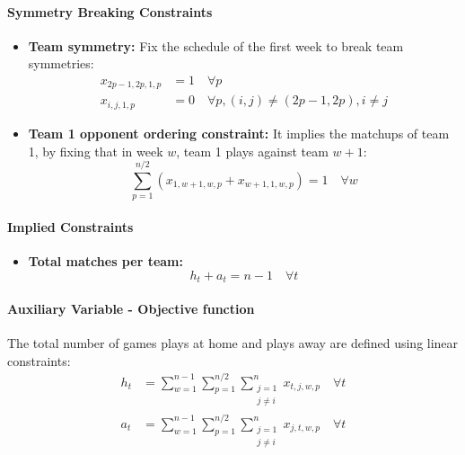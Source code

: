 \documentclass{article}
\begin{document}
\paragraph{Symmetry Breaking Constraints}

\begin{itemize}
    \item \textbf{Team symmetry:} Fix the schedule of the first week to break team symmetries:
    \begin{align}
        x_{2p-1,2p,1,p} &= 1 \quad \forall p \\
        x_{i,j,1,p} &= 0 \quad \forall p, (i,j) \neq (2p-1, 2p), i \neq j
    \end{align}

    \item \textbf{Team 1 opponent ordering constraint:}
It implies the matchups of team 1, by fixing that in week $w$, team 1 plays against team $w+1$:
\begin{equation}
    \sum_{p=1}^{n/2} \left( x_{1,w+1,w,p} + x_{w+1,1,w,p} \right) = 1 \quad \forall w
\end{equation}
\end{itemize}

\paragraph{Implied Constraints}
\begin{itemize}
    \item \textbf{Total matches per team:}
    \begin{equation}
        h_t + a_t = n - 1 \quad \forall t
    \end{equation}
\end{itemize}

\paragraph{Auxiliary Variable - Objective function}

The total number of games plays at home and plays away are defined using linear constraints:
\begin{align}
h_t &= \sum_{w=1}^{n-1} \sum_{p=1}^{n/2} \sum_{\substack{j=1 \\ j \neq i}}^{n} x_{t,j,w,p} \quad \forall t \\
a_t &= \sum_{w=1}^{n-1} \sum_{p=1}^{n/2} \sum_{\substack{j=1 \\ j \neq i}}^{n} x_{j,t,w,p} \quad \forall t
\end{align}
\end{document}
